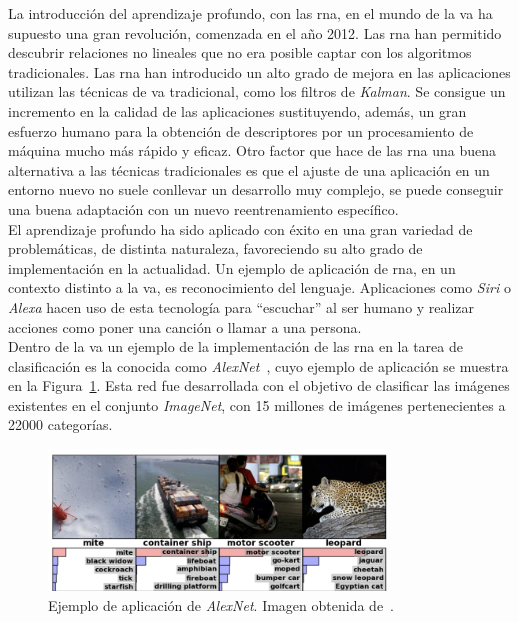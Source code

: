 La introducción del aprendizaje profundo, con las \acrshort{rna}, en el mundo de la \acrshort{va} ha supuesto una gran revolución, comenzada en el año 2012. Las \acrshort{rna} han permitido descubrir relaciones no lineales que no era posible captar con los algoritmos tradicionales. Las \acrshort{rna} han introducido un alto grado de mejora en las aplicaciones utilizan las técnicas de \acrshort{va} tradicional, como los filtros de \textit{Kalman}. Se consigue un incremento en la calidad de las aplicaciones sustituyendo, además, un gran esfuerzo humano para la obtención de descriptores por un procesamiento de máquina mucho más rápido y eficaz. Otro factor que hace de las \acrshort{rna} una buena alternativa a las técnicas tradicionales es que el ajuste de una aplicación en un entorno nuevo no suele conllevar un desarrollo muy complejo, se puede conseguir una buena adaptación con un nuevo reentrenamiento específico.\\

El aprendizaje profundo ha sido aplicado con éxito en una gran variedad de problemáticas, de distinta naturaleza, favoreciendo su alto grado de implementación en la actualidad. Un ejemplo de aplicación de \acrshort{rna}, en un contexto distinto a la \acrshort{va}, es reconocimiento del lenguaje. Aplicaciones como \textit{Siri} o \textit{Alexa} hacen uso de esta tecnología para ``escuchar'' al ser humano y realizar acciones como poner una canción o llamar a una persona.\\

Dentro de la \acrshort{va} un ejemplo de la implementación de las \acrshort{rna} en la tarea de clasificación es la conocida como \textit{AlexNet}~\cite{NIPS2012_4824}, cuyo ejemplo de aplicación se muestra en la Figura~\ref{fig.alexnet}. Esta red fue desarrollada con el objetivo de clasificar las imágenes existentes en el conjunto \textit{ImageNet}, con 15 millones de imágenes pertenecientes a 22000 categorías.
\vspace{10pt}
\begin{figure}[H]
		\begin{center}
			\includegraphics[width=0.8\textwidth]{ figures/intro/alexnet.png}
			\caption{Ejemplo de aplicación de \textit{AlexNet}. Imagen obtenida de~\cite{NIPS2012_4824}.}
			\label{fig.alexnet}
		\end{center}
\end{figure}
\vspace{-10pt}

